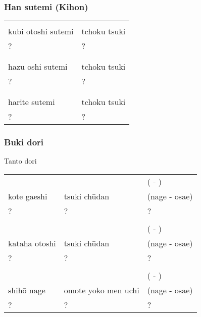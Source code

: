 \subsubsection{Han sutemi (Kihon)}
\begin{table}[H]
\begin{center}
\begin{tabular}{ll}
    \ruby{}{} & \ruby{}{}\\
    kubi otoshi sutemi & tchoku tsuki\\
    ? & ?\\
    \\
    \ruby{}{} & \ruby{}{}\\
    hazu oshi sutemi & tchoku tsuki\\
    ? & ?\\
    \\
    \ruby{}{} & \ruby{}{}\\
    harite sutemi & tchoku tsuki\\
    ? & ?
\end{tabular}
\end{center}
\label{dan_2_bukidori_tanto}
\end{table}

\subsubsection{Buki dori}
Tanto dori
\begin{table}[H]
\begin{center}
\begin{tabular}{lll}
    \ruby{}{} & \ruby{}{} & (\ruby{}{} - \ruby{}{})\\
    kote gaeshi & tsuki ch\={u}dan & (nage - osae)\\
    ? & ? & ?\\
    \\
    \ruby{}{} & \ruby{}{} & (\ruby{}{} - \ruby{}{})\\
    kataha otoshi & tsuki ch\={u}dan & (nage - osae)\\
    ? & ? & ?\\
    \\
    \ruby{}{} & \ruby{}{} & (\ruby{}{} - \ruby{}{})\\
    shih\={o} nage & omote yoko men uchi & (nage - osae)\\ 
    ? & ? & ?
\end{tabular}
\end{center}
\label{dan_2_bukidori_tanto}
\end{table}


